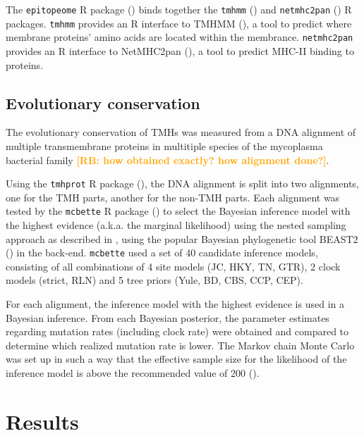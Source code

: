 \documentclass{article}
\newcommand{\richel}[1]{\textcolor{orange}{\textbf{[RB: #1]}}}
\begin{document}
The \verb;epitopeome; R package (\cite{epitopeome}) binds 
together the \verb;tmhmm; (\cite{tmhmm}) and \verb;netmhc2pan; 
(\cite{netmhc2pan}) 
R packages. \verb;tmhmm; provides an R interface to
TMHMM (\cite{krogh2001predicting, sonnhammer1998hidden}), a tool
to predict where membrane proteins' amino acids are located within the
membrance.   
\verb;netmhc2pan; provides an R interface to
NetMHC2pan (\cite{jensen2018improved}), a tool
to predict MHC-II binding to proteins.

\subsection{Evolutionary conservation}

The evolutionary conservation of TMHs was measured from a
DNA alignment of multiple transmembrane proteins in multitiple
species of the mycoplasma bacterial family
\richel{how obtained exactly? how alignment done?}.

Using the \verb;tmhprot; R package (\cite{tmhprot}), the DNA alignment is split
into two alignments, one for the TMH parts, another for the non-TMH
parts. Each alignment was tested by the \verb;mcbette; 
R package (\cite{mcbette}) to select the Bayesian inference model with
the highest evidence (a.k.a. the marginal likelihood) using the nested
sampling approach as described in \cite{maturana2018model},
using the popular Bayesian phylogenetic tool 
BEAST2 (\cite{bouckaert2014beast}) in the back-end.
\verb;mcbette; used a set of 40 candidate inference models, 
consisting of all combinations of 
4 site models (JC, HKY, TN, GTR), 
2 clock models (strict, RLN) and 
5 tree priors (Yule, BD, CBS, CCP, CEP).

For each alignment, the inference model with the highest evidence
is used in a Bayesian inference. From each Bayesian posterior,
the parameter estimates regarding mutation rates (including clock rate)
were obtained and compared to determine which realized mutation rate is lower.
The Markov chain Monte Carlo was set up in such a way that the effective sample
size for the likelihood of the inference model is above the recommended value
of 200 (\cite{bouckaert2014beast}).

\section{Results}
\end{document}
